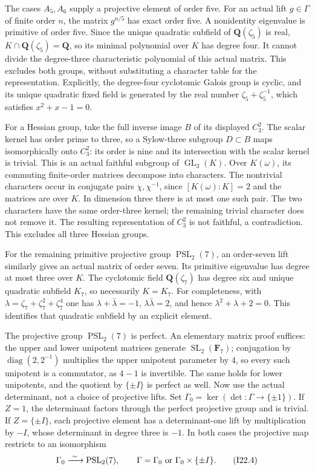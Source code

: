 The cases $A_5,A_6$ supply a projective element of order five.
For an actual lift $g\in\Gamma$ of finite order $n$, the
matrix $g^{n/5}$ has exact order five. A nonidentity
eigenvalue is primitive of order five. Since the unique
quadratic subfield of $\mathbf Q(\zeta_5)$ is real,
$K\cap\mathbf Q(\zeta_5)=\mathbf Q$, so its minimal
polynomial over $K$ has degree four. It cannot divide the
degree-three characteristic polynomial of this actual matrix.
This excludes both groups, without substituting a character
table for the representation.
Explicitly, the degree-four cyclotomic Galois group is cyclic,
and its unique quadratic fixed field is generated by the real
number $\zeta_5+\zeta_5^{-1}$, which satisfies $x^2+x-1=0$.

For a Hessian group, take the full inverse image $B$ of
its displayed $C_3^2$. The scalar kernel has order prime
to three, so a Sylow-three subgroup $D\subset B$ maps
isomorphically onto $C_3^2$: its order is nine and its
intersection with the scalar kernel is trivial. This is
an actual faithful subgroup of $\operatorname{GL}_3(K)$.
Over $K(\omega)$, its commuting finite-order matrices
decompose into characters. The nontrivial characters occur
in conjugate pairs $\chi,\chi^{-1}$, since
$[K(\omega):K]=2$ and the matrices are over $K$.
In dimension three there is at most one such pair.
The two characters have the same order-three kernel;
the remaining trivial character does not remove it.
The resulting representation of $C_3^2$ is not faithful,
a contradiction. This excludes all three Hessian groups.

For the remaining primitive projective group
$\operatorname{PSL}_2(7)$, an order-seven lift similarly
gives an actual matrix of order seven. Its primitive
eigenvalue has degree at most three over $K$.
The cyclotomic field $\mathbf Q(\zeta_7)$ has degree six
and unique quadratic subfield $K_7$, so necessarily $K=K_7$.
For completeness, with
$\lambda=\zeta_7+\zeta_7^2+\zeta_7^4$ one has
$\lambda+\bar\lambda=-1$, $\lambda\bar\lambda=2$,
and hence $\lambda^2+\lambda+2=0$. This identifies that
quadratic subfield by an explicit element.

The projective group $\operatorname{PSL}_2(7)$ is perfect.
An elementary matrix proof suffices: the upper and lower
unipotent matrices generate $\operatorname{SL}_2(\mathbf F_7)$;
conjugation by $\operatorname{diag}(2,2^{-1})$ multiplies
the upper unipotent parameter by $4$, so every such
unipotent is a commutator, as $4-1$ is invertible.
The same holds for lower unipotents, and the quotient
by $\{\pm I\}$ is perfect as well.
Now use the actual determinant, not a choice of projective lifts.
Set $\Gamma_0=\ker(\det:\Gamma\to\{\pm1\})$.
If $Z=1$, the determinant factors through the perfect
projective group and is trivial. If $Z=\{\pm I\}$,
each projective element has a determinant-one lift by
multiplication by $-I$, whose determinant in degree three
is $-1$. In both cases the projective map restricts to
an isomorphism
\[
 \Gamma_0\xrightarrow{\ \sim\ }\operatorname{PSL}_2(7),
 \qquad \Gamma=\Gamma_0\ \hbox{or}\ \Gamma_0\times\{\pm I\}.
                                                               \tag{I22.4}
\]

